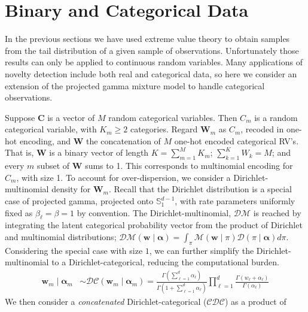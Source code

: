 \section{Binary and Categorical Data\label{sec:categorical}}
In the previous sections we have used extreme value theory to obtain samples
    from the tail distribution of a given sample of observations. Unfortunately 
    those results can only be applied to continuous random variables.  Many 
    applications of novelty detection include both real and categorical 
    data, so here we consider an extension of the projected gamma mixture model 
    to handle categorical observations. 

Suppose $\bm{C}$ is a vector of $M$ random categorical variables.  Then $C_m$ 
    is a random categorical variable, with $K_{m} \geq 2$ categories. Regard 
    $\bm{W}_m$ as $C_m$, recoded in one-hot encoding, and $\bm{W}$ the 
    concatenation of $M$ one-hot encoded categorical RV's. That is, $\bm{W}$ 
    is a binary vector of length $K = \sum_{m = 1}^M K_{m}$; 
    $\sum_{k = 1}^K W_k = M$; and every $m$ subset of $\bm{W}$ sums to 1.  This 
    corresponds to multinomial encoding for $C_m$, with size 1. To account for
    over-dispersion, we consider a Dirichlet-multinomial density for $\bm{W}_m$.
    Recall that the Dirichlet distribution is a special case of projected gamma,
    projected onto $\mathbb{S}_1^{d-1}$, with rate parameters uniformly fixed
    as $\beta_{\ell} = \beta = 1$ by convention.  The Dirichlet-multinomial,
    $\mathcal{DM}$
    is reached by integrating the latent categorical probability vector from
    the product of Dirichlet and multinomial distributions; 
    $\mathcal{DM}(\bm{w}\mid\bm{\alpha}) = \int_{\pi}\mathcal{M}(\bm{w}\mid\pi)\mathcal{D}(\pi\mid\bm{\alpha})d\pi$.
    Considering the special case with size $1$, we can further simplify the
    Dirichlet-multinomial to a Dirichlet-categorical, reducing the computational 
    burden.
    \begin{equation}
        \begin{aligned}
        \label{eqn:dirmultinom}
        \bm{w}_{m}\mid\bm{\alpha}_m 
        &\sim 
        \mathcal{DC}(\bm{w}_m\mid\bm{\alpha}_m) = 
        \frac{\Gamma(\sum_{\ell=1}^d \alpha_{\ell})}{\Gamma(1 + \sum_{\ell = 1}^d\alpha_{\ell})}
        \prod_{\ell = 1}^d \frac{\Gamma(w_{\ell} + \alpha_{\ell})}{\Gamma(\alpha_{\ell})}
        \end{aligned}
    \end{equation}
    We then consider a \emph{concatenated} 
    Dirichlet-categorical ($\mathcal{CDC}$) as a product of 
